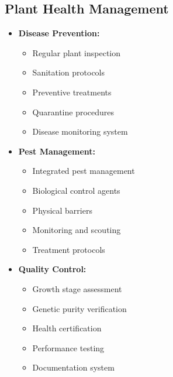 \subsection{Plant Health Management}
\begin{itemize}
    \item \textbf{Disease Prevention:}
    \begin{itemize}
        \item Regular plant inspection
        \item Sanitation protocols
        \item Preventive treatments
        \item Quarantine procedures
        \item Disease monitoring system
    \end{itemize}
    
    \item \textbf{Pest Management:}
    \begin{itemize}
        \item Integrated pest management
        \item Biological control agents
        \item Physical barriers
        \item Monitoring and scouting
        \item Treatment protocols
    \end{itemize}
    
    \item \textbf{Quality Control:}
    \begin{itemize}
        \item Growth stage assessment
        \item Genetic purity verification
        \item Health certification
        \item Performance testing
        \item Documentation system
    \end{itemize}
\end{itemize}

